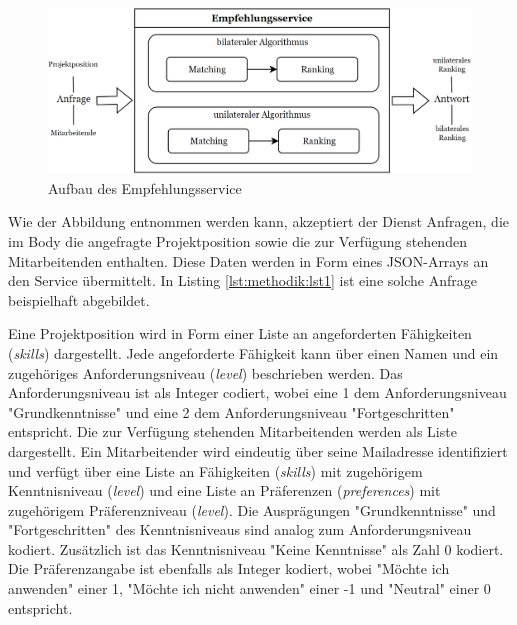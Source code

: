 \begin{figure}[H]
    \centering
	\includegraphics[width=1.0\textwidth]{gfx/empfehlungsservice.png}
	\caption[Aufbau des Empfehlungsservice]{Aufbau des Empfehlungsservice}
	\label{fig:methodik:abb8}
\end{figure}

Wie der Abbildung entnommen werden kann, akzeptiert der Dienst Anfragen, die im Body die angefragte Projektposition sowie die zur Verfügung stehenden Mitarbeitenden enthalten.
Diese Daten werden in Form eines JSON-Arrays an den Service übermittelt.
In Listing \ref{lst:methodik:lst1} ist eine solche Anfrage beispielhaft abgebildet.



Eine Projektposition wird in Form einer Liste an angeforderten Fähigkeiten (\textit{skills}) dargestellt.
Jede angeforderte Fähigkeit kann über einen Namen und ein zugehöriges Anforderungsniveau (\textit{level}) beschrieben werden.
Das Anforderungsniveau ist als Integer codiert, wobei eine 1 dem Anforderungsniveau "Grundkenntnisse" und eine 2 dem Anforderungsniveau "Fortgeschritten" entspricht.
Die zur Verfügung stehenden Mitarbeitenden werden als Liste dargestellt.
Ein Mitarbeitender wird eindeutig über seine Mailadresse identifiziert und verfügt über eine Liste an Fähigkeiten (\textit{skills}) mit zugehörigem Kenntnisniveau (\textit{level}) und eine Liste an Präferenzen (\textit{preferences}) mit zugehörigem Präferenzniveau (\textit{level}).
Die Ausprägungen "Grundkenntnisse" und "Fortgeschritten" des Kenntnisniveaus sind analog zum Anforderungsniveau kodiert.
Zusätzlich ist das Kenntnisniveau "Keine Kenntnisse" als Zahl 0 kodiert.
Die Präferenzangabe ist ebenfalls als Integer kodiert, wobei "Möchte ich anwenden" einer 1, "Möchte ich nicht anwenden" einer -1 und "Neutral" einer 0 entspricht.

